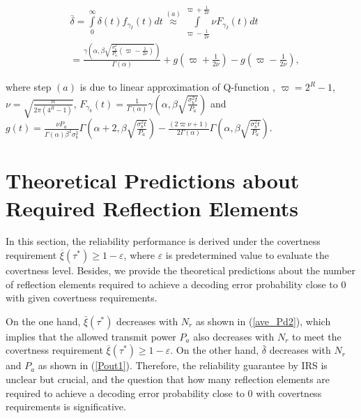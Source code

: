 \documentclass[conference]{IEEEtran}
\begin{document}
\begin{small}
\begin{equation}\label{Pout1}
	\begin{aligned}
	&\bar \delta  \!=\! \int\limits_0^\infty  {\delta \left( t \right)} {f_{{\gamma _I}}}(t)dt\mathop  \approx \limits^{(a)} \int\limits_{\!\varpi  - \frac{1}{{2\nu }}}^{\varpi  + \frac{1}{{2\nu }}}\! {\!\nu\! {F_{{\gamma _I}}}\left( t \right)dt} \\
	&\!=\! \frac{{\gamma \!\left(\! {\alpha ,\beta \sqrt {\frac{{\sigma _b^2}}{{{P_a}}}\left( {\varpi  \!-\! \frac{1}{{2\nu }}} \!\right)\!} } \right)}}{{\Gamma \left( \alpha  \right)}} \!+\! g(\varpi  \!+\! \frac{1}{{2\nu }}) \!-\! g(\varpi  \!-\! \frac{1}{{2\nu }}),
	\end{aligned}
\end{equation}
\end{small}
where step $(a)$ is due to linear approximation of Q-function \cite{Q_app}, $\varpi  \!=\! {2^R} \!-\! 1$, $\nu  \!=\! \sqrt {\frac{n}{{2\pi \left( {{4^R} - 1} \right)}}} $, ${F_{{\gamma _b}}}\left( t \right) = \frac{1}{{\Gamma \left( \alpha  \right)}}\gamma \left( {\alpha ,\beta \sqrt {\frac{{\sigma _b^2t}}{{{P_a}}}} } \right)$ and $g(t) = \frac{{\nu {P_a}}}{{\Gamma (\alpha ){\beta ^2}\sigma _b^2}}\Gamma \left( {\alpha  + 2,\beta \sqrt {\frac{{\sigma _b^2t}}{{{P_a}}}} } \right) - \frac{{(2\varpi \nu  + 1)}}{{2\Gamma (\alpha )}}\Gamma \left( {\alpha ,\beta \sqrt {\frac{{\sigma _b^2t}}{{{P_a}}}} } \right)$.
\section{Theoretical Predictions about Required Reflection Elements}
In this section, the reliability performance is derived under the covertness requirement ${\overline \xi (\tau^*)} \geq 1 - \varepsilon $, where $\varepsilon$ is predetermined value to evaluate the covertness level. Besides, we provide the theoretical predictions about the number of reflection elements required to achieve a decoding error probability close to $0$ with given covertness requirements. 

On the one hand, $\bar \xi(\tau^*)$ decreases with $N_r$ as shown in (\ref{ave_Pd2}), which implies that the allowed transmit power $P_a$ also decreases with $N_r$ to meet the covertness requirement ${\overline \xi (\tau^*)} \geq 1 - \varepsilon $. On the other hand, $\bar\delta$ decreases with $N_r$ and $P_a$ as shown in (\ref{Pout1}). Therefore, the reliability guarantee by IRS is unclear but crucial, and the question that how many reflection elements are required to achieve a decoding error probability close to 0 with covertness requirements is significative.
\end{document}
